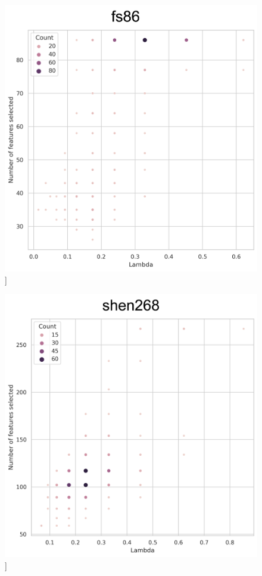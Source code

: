 \documentclass[phd,tocprelim]{cornell}
\renewcommand{\caption}[1]{\singlespacing\hangcaption{#1}\normalspacing}
\begin{document}
\null
\vfill
\clearpage
\null
\vfill
\begin{figure}[h!]
		\ContinuedFloat
		\captionsetup{labelformat=adja-page}
    \centering
    \includegraphics[width=1\textwidth]{chapter3/SupplementaryFig9a.png}
    \caption[]{}
\end{figure}
\null
\vfill
\clearpage
\null
\vfill
\begin{figure}[h!]
		\ContinuedFloat
		\captionsetup{labelformat=adja-page}
    \centering
    \includegraphics[width=1\textwidth]{chapter3/SupplementaryFig9b.png}
    \caption[]{}
\end{figure}
\null
\vfill
\clearpage
\null
\vfill
\end{document}
